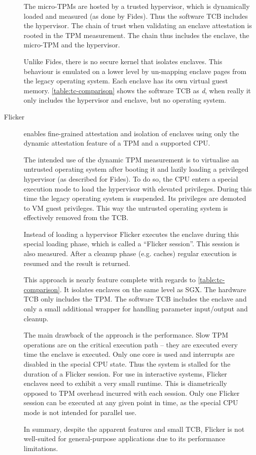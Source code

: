 \begin{description}
The micro-TPMs are hosted by a trusted hypervisor, which is dynamically loaded and measured (as done by Fides).\label{ID_488141781}
Thus the software TCB includes the hypervisor. The chain of trust when validating an enclave attestation is rooted in the TPM measurement. The chain thus includes the enclave, the micro-TPM and the hypervisor.\label{ID_1898494666}

Unlike Fides, there is no secure kernel that isolates enclaves. This behaviour is emulated on a lower level by un-mapping enclave pages from the legacy operating system. Each enclave has its own virtual guest memory. \autoref{table:tc-comparison} shows the software TCB as \textit{d}, when really it only includes the hypervisor and enclave, but no operating system.\label{ID_708049480}
\item[Flicker\cite{McCune2008}]\label{ID_878060233}
enables fine-grained attestation and isolation of enclaves using only the dynamic attestation feature of a TPM and a supported CPU.\label{ID_445599816}

The intended use of the dynamic TPM measurement is to virtualise an untrusted operating system after booting it and lazily loading a privileged hypervisor (as described for Fides).\label{ID_1988839866}
To do so, the CPU enters a special execution mode to load the hypervisor with elevated privileges. During this time the legacy operating system is suspended. Its privileges are demoted to VM guest privileges. This way the untrusted operating system is effectively removed from the TCB.\label{ID_670518178}

Instead of loading a hypervisor Flicker executes the enclave during this special loading phase, which is called a ``Flicker session''.\label{ID_827948010}
This session is also measured. After a cleanup phase (e.g. caches) regular execution is resumed and the result is returned.\label{ID_1543044077}

This approach is nearly feature complete with regards to \autoref{table:tc-comparison}. It isolates enclaves on the same level as SGX. The hardware TCB only includes the TPM. The software TCB includes the enclave and only a small additional wrapper for handling parameter input/output and cleanup.\label{ID_504952060}

The main drawback of the approach is the performance. Slow TPM operations are on the critical execution path -- they are executed every time the enclave is executed.\label{ID_2022441}
Only one core is used and interrupts are disabled in the special CPU state. Thus the system is stalled for the duration of a Flicker session. For use in interactive systems, Flicker enclaves need to exhibit a very small runtime. This is diametrically opposed to TPM overhead incurred with each session.\label{ID_1920950472}
Only one Flicker session can be executed at any given point in time, as the special CPU mode is not intended for parallel use.\label{ID_466004716}

In summary, despite the apparent features and small TCB, Flicker is not well-suited for general-purpose applications due to its performance limitations.\label{ID_1094537554}
\end{description}\label{ID_294304177}
